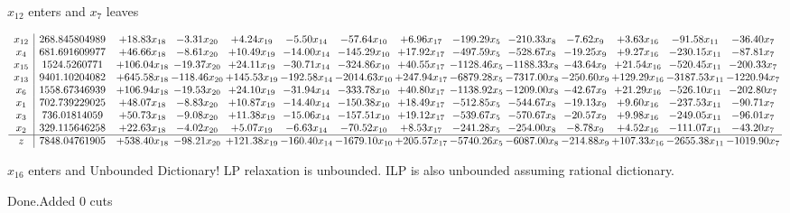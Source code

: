 \documentclass[8pt]{article}
\begin{document}
 $ x_{12} $ enters and $ x_{7} $ leaves 

 \[\begin{array}{c| c c@{\hskip 2pt} c@{\hskip 2pt} c@{\hskip 2pt} c@{\hskip 2pt} c@{\hskip 2pt} c@{\hskip 2pt} c@{\hskip 2pt} c@{\hskip 2pt} c@{\hskip 2pt} c@{\hskip 2pt} c@{\hskip 2pt} c@{\hskip 2pt} }
 x_{12}   &  268.845804989 & + 18.83 x_{18} & -3.31 x_{20} & +  4.24 x_{19} & -5.50 x_{14} & -57.64 x_{10} & +  6.96 x_{17} & -199.29 x_{5} & -210.33 x_{8} & -7.62 x_{9} & +  3.63 x_{16} & -91.58 x_{11} & -36.40 x_{7}\\
 x_{4}   &  681.691609977 & + 46.66 x_{18} & -8.61 x_{20} & + 10.49 x_{19} & -14.00 x_{14} & -145.29 x_{10} & + 17.92 x_{17} & -497.59 x_{5} & -528.67 x_{8} & -19.25 x_{9} & +  9.27 x_{16} & -230.15 x_{11} & -87.81 x_{7}\\
 x_{15}   &  1524.5260771 & + 106.04 x_{18} & -19.37 x_{20} & + 24.11 x_{19} & -30.71 x_{14} & -324.86 x_{10} & + 40.55 x_{17} & -1128.46 x_{5} & -1188.33 x_{8} & -43.64 x_{9} & + 21.54 x_{16} & -520.45 x_{11} & -200.33 x_{7}\\
 x_{13}   &  9401.10204082 & + 645.58 x_{18} & -118.46 x_{20} & + 145.53 x_{19} & -192.58 x_{14} & -2014.63 x_{10} & + 247.94 x_{17} & -6879.28 x_{5} & -7317.00 x_{8} & -250.60 x_{9} & + 129.29 x_{16} & -3187.53 x_{11} & -1220.94 x_{7}\\
 x_{6}   &  1558.67346939 & + 106.94 x_{18} & -19.53 x_{20} & + 24.10 x_{19} & -31.94 x_{14} & -333.78 x_{10} & + 40.80 x_{17} & -1138.92 x_{5} & -1209.00 x_{8} & -42.67 x_{9} & + 21.29 x_{16} & -526.10 x_{11} & -202.80 x_{7}\\
 x_{1}   &  702.739229025 & + 48.07 x_{18} & -8.83 x_{20} & + 10.87 x_{19} & -14.40 x_{14} & -150.38 x_{10} & + 18.49 x_{17} & -512.85 x_{5} & -544.67 x_{8} & -19.13 x_{9} & +  9.60 x_{16} & -237.53 x_{11} & -90.71 x_{7}\\
 x_{3}   &  736.01814059 & + 50.73 x_{18} & -9.08 x_{20} & + 11.38 x_{19} & -15.06 x_{14} & -157.51 x_{10} & + 19.12 x_{17} & -539.67 x_{5} & -570.67 x_{8} & -20.57 x_{9} & +  9.98 x_{16} & -249.05 x_{11} & -96.01 x_{7}\\
 x_{2}   &  329.115646258 & + 22.63 x_{18} & -4.02 x_{20} & +  5.07 x_{19} & -6.63 x_{14} & -70.52 x_{10} & +  8.53 x_{17} & -241.28 x_{5} & -254.00 x_{8} & -8.78 x_{9} & +  4.52 x_{16} & -111.07 x_{11} & -43.20 x_{7}\\
\hline
z    &  7848.04761905 & + 538.40 x_{18} & -98.21 x_{20} & + 121.38 x_{19} & -160.40 x_{14} & -1679.10 x_{10} & + 205.57 x_{17} & -5740.26 x_{5} & -6087.00 x_{8} & -214.88 x_{9} & + 107.33 x_{16} & -2655.38 x_{11} & -1019.90 x_{7}\\
\end{array}\]


 $ x_{16} $ enters and Unbounded Dictionary!
 LP relaxation is unbounded. ILP is also unbounded assuming rational dictionary. 

Done.Added 0 cuts 
\end{document}
